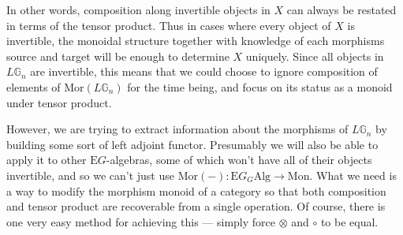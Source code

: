In other words, composition along invertible objects in $X$ can always be restated in terms of the tensor product. Thus in cases where every object of $X$ is invertible, the monoidal structure together with knowledge of each morphisms source and target will be enough to determine $X$ uniquely. Since all objects in $L\mathbb{G}_n$ are invertible, this means that we could choose to ignore composition of elements of $\mathrm{Mor}(L\mathbb{G}_n)$ for the time being, and focus on its status as a monoid under tensor product.

However, we are trying to extract information about the morphisms of $L\mathbb{G}_n$ by building some sort of left adjoint functor. Presumably we will also be able to apply it to other $\mathrm{E}G$-algebras, some of which won't have all of their objects invertible, and so we can't just use $\mathrm{Mor}(-): \mathrm{E}G_G\mathrm{Alg} \to \mathrm{Mon}$. What we need is a way to modify the morphism monoid of a category so that both composition and tensor product are recoverable from a single operation. Of course, there is one very easy method for achieving this --- simply force $\otimes$ and $\circ$ to be equal.

